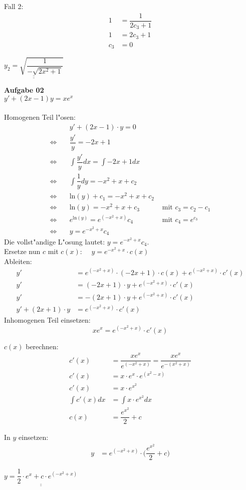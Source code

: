 \documentclass[a4paper,10pt]{article}
\begin{document}
	Fall 2:
	\begin{align*}
	1 & = \dfrac{1}{2c_3 + 1}\\
	1 & = 2c_3 +1\\
	c_3 & = 0
	\end{align*}
	\begin{center}
		$\underline{\underline{y_2 = \sqrt{\dfrac{1}{-\sqrt{2x^2 + 1}}}}}$
	\end{center}
	\newpage
	\textbf{Aufgabe 02}\\
	$y' + (2x - 1)y = xe^x$\\\\
	Homogenen Teil l"osen:\\
	\begin{align*}
		& y' + (2x - 1) \cdot y   =  0\\
		\Leftrightarrow \quad & \dfrac{y'}{y}  =  -2x + 1	\\
		\Leftrightarrow \quad & \int \dfrac{y'}{y}dx  =  \int-2x + 1 dx \\
		\Leftrightarrow \quad & \int \dfrac{1}{y}dy  =  -x^2 + x +c_2\\
		\Leftrightarrow \quad & \text{ln}(y) + c_1  =  -x^2 + x +c_2 \\
		\Leftrightarrow \quad & \text{ln}(y)  =  -x^2+ x + c_3  & \text{ mit }c_3 = c_2 - c_1 \\
		\Leftrightarrow \quad & e^{\text{ln}(y)}  = e^{(-x^2+x)}c_4  & \text{ mit } c_4 = e^{c_3} \\
		\Leftrightarrow \quad & y = e^{-x^2 + x}c_4
	\end{align*}
	Die vollst"andige L"osung lautet: $y = e^{-x^2 + x}c_4$.\\
		
	Ersetze nun $c$ mit $c(x)$: $\quad y = e^{-x^2 + x} \cdot c(x)$\\
	
	Ableiten:
	\begin{align*}
		y' & = e^{(-x^2 + x)} \cdot (-2x + 1) \cdot c(x) + e^{(-x^2 + x)} \cdot c'(x)\\
		y' & = (-2x +1) \cdot y + e^{(-x^2 + x)} \cdot c'(x)\\
		y' & = -(2x +1) \cdot y + e^{(-x^2 + x)} \cdot c'(x)\\
		y' + (2x +1) \cdot y & = e^{(-x^2 + x)} \cdot c'(x)
	\end{align*}
	Inhomogenen Teil einsetzen: \[xe^x = e^{(-x^2 + x)} \cdot c'(x)\]
	
	$c(x)$ berechnen:
	\begin{align*}
		c'(x) & = \dfrac{xe^x}{e^{(-x^2 + x)}} = \dfrac{xe^x}{e^{-(x^2 + x)}} \\
		c'(x) & = x\cdot e^x \cdot e^{(x^2 - x)} \\
		c'(x) & = x\cdot e^{x^2}\\
		\int c'(x) dx & = \int x \cdot e^{x^2} dx\\
		c(x) & = \dfrac{e^{x^2}}{2} + c
	\end{align*}

	In $y$ einsetzen:
	\begin{align*}
	y & = e^{(-x^2 + x)} \cdot \Big( \dfrac{e^{x^2}}{2} + c\Big)
	\end{align*}
	\begin{center}
		$\underline{\underline{y = \dfrac{1}{2} \cdot e^x + c \cdot e^{(-x^2 + x)}}}$
	\end{center}
\end{document}
